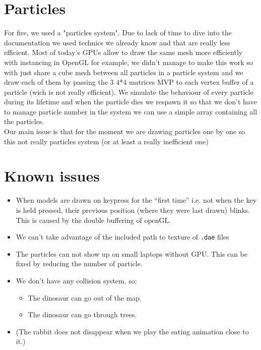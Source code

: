 \documentclass[11pt]{article}
\begin{document}
\section{Particles}
\noindent For fire, we used a "particles system". Due to lack of time to dive into the documentation we used technics we already know and that are really less efficient. Most of today's GPUs allow to draw the same mesh more efficiently with instancing in OpenGL for example, we didn't manage to make this work so with just share a cube mesh between all particles in a particle system and we draw each of them by passing the 3 4*4 matrices MVP to each vertex buffer of a particle (wich is not really efficient). We simulate the behaviour of every particle during its lifetime and when the particle dies we respawn it so that we don't have to manage particle number in the system we can use a simple array containing all the particles.\\
Our main issue is that for the moment we are drawing particles one by one so this not really particles system (or at least a really inefficient one)


\section*{Known issues}
\begin{itemize}
    \item When models are drawn on keypress for the ``first time'' i.e. not when the key is held pressed, their previous position (where they were last drawn) blinks. This is caused by the double buffering of openGL.
    \item We can't take advantage of the included path to texture of \texttt{.dae} files
    \item The particles can not show up on small laptops without GPU. This can be fixed by reducing the number of particle.
    \item We don't have any collision system, so:
    \begin{itemize}
        \item The dinosaur can go out of the map.
        \item The dinosaur can go through trees.
    \end{itemize}
    \item (The rabbit does not disappear when we play the eating animation close to it.)
\end{itemize}
\end{document}
